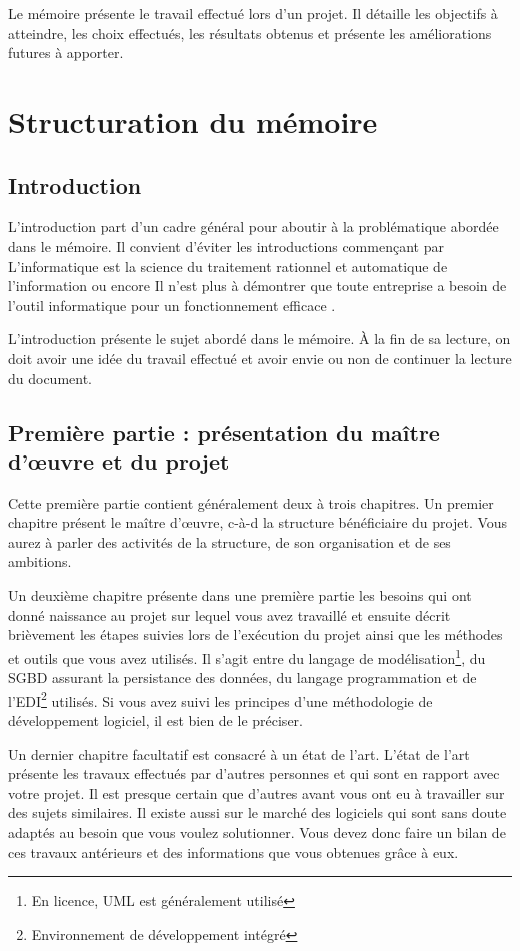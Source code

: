 \documentclass[12pt]{article}
\begin{document}
Le mémoire présente le travail effectué lors d'un projet. Il détaille les objectifs à atteindre, les choix effectués, les résultats obtenus et présente les améliorations futures à apporter.

\section{Structuration du mémoire}

\subsection{Introduction}
L'introduction part d'un cadre général pour aboutir à la problématique abordée dans le mémoire. Il convient d'éviter les introductions commençant par \og L'informatique est la science du traitement rationnel et automatique de l'information \fg{} ou encore \og Il n'est plus à démontrer que toute entreprise a besoin de l'outil informatique pour un fonctionnement efficace \fg{}.

L'introduction présente le sujet abordé dans le mémoire. \`A la fin de sa lecture, on doit avoir une idée du travail effectué et avoir envie ou non de continuer la lecture du document.

\subsection{Première partie : présentation du maître d'\oe{}uvre et du projet}
Cette première partie contient généralement deux à trois chapitres. Un premier chapitre présent le maître d'\oe{}uvre, c-à-d la structure bénéficiaire du projet. Vous aurez à parler des activités de la structure, de son organisation et de ses ambitions.

Un deuxième chapitre présente dans une première partie les besoins qui ont donné naissance au projet sur lequel vous avez travaillé et ensuite décrit brièvement les étapes suivies lors de l'exécution du projet ainsi que les méthodes et outils que vous avez utilisés. Il s'agit entre du langage de modélisation\footnote{En licence, UML est généralement utilisé}, du SGBD assurant la persistance des données, du langage programmation et de l'EDI\footnote{Environnement de développement intégré} utilisés. Si vous avez suivi les principes d'une méthodologie de développement logiciel, il est bien de le préciser.

Un dernier chapitre facultatif est consacré à un état de l'art. L'état de l'art présente les travaux effectués par d'autres personnes et qui sont en rapport avec votre projet. Il est presque certain que d'autres avant vous ont eu à travailler sur des sujets similaires. Il existe aussi sur le marché des logiciels qui sont sans doute adaptés au besoin que vous voulez solutionner. Vous devez donc faire un bilan de ces travaux antérieurs et des informations que vous obtenues grâce à eux.
\end{document}
